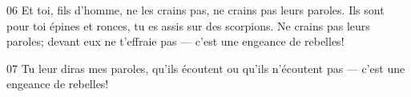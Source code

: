 
06 Et toi, fils d’homme, ne les crains pas, ne crains pas leurs paroles. Ils sont pour toi épines et ronces, tu es assis sur des scorpions. Ne crains pas leurs paroles; devant eux ne t’effraie pas --- c’est une engeance de rebelles!

07 Tu leur diras mes paroles, qu’ils écoutent ou qu’ils n’écoutent pas --- c’est une engeance de rebelles!
